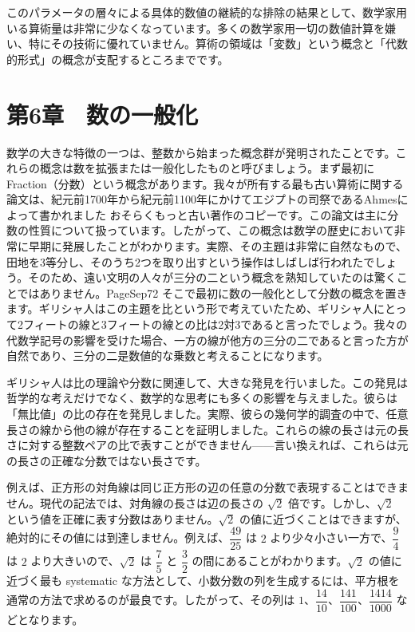 \documentclass[a4paper,11pt,openany]{ltjsbook}
\begin{document}
このパラメータの層々による具体的数値の継続的な排除の結果として、数学家用いる算術量は非常に少なくなっています。多くの数学家用一切の数値計算を嫌い、特にその技術に優れていません。算術の領域は「変数」という概念と「代数的形式」の概念が支配するところまでです。

\chapter{第6章　数の一般化}

数学の大きな特徴の一つは、整数から始まった概念群が発明されたことです。これらの概念は数を拡張または一般化したものと呼びましょう。まず最初に Fraction（分数）という概念があります。我々が所有する最も古い算術に関する論文は、紀元前1700年から紀元前1100年にかけてエジプトの司祭であるAhmesによって書かれました おそらくもっと古い著作のコピーです。この論文は主に分数の性質について扱っています。したがって、この概念は数学の歴史において非常に早期に発展したことがわかります。実際、その主題は非常に自然なもので、田地を3等分し、そのうち2つを取り出すという操作はしばしば行われたでしょう。そのため、遠い文明の人々が三分の二という概念を熟知していたのは驚くことではありません。PageSep{72} そこで最初に数の一般化として分数の概念を置きます。ギリシャ人はこの主題を比という形で考えていたため、ギリシャ人にとって2フィートの線と3フィートの線との比は2対3であると言ったでしょう。我々の代数学記号の影響を受けた場合、一方の線が他方の三分の二であると言った方が自然であり、三分の二是数値的な乗数と考えることになります。

ギリシャ人は比の理論や分数に関連して、大きな発見を行いました。この発見は哲学的な考えだけでなく、数学的な思考にも多くの影響を与えました。彼らは「無比値」の比の存在を発見しました。実際、彼らの幾何学的調査の中で、任意長さの線から他の線が存在することを証明しました。これらの線の長さは元の長さに対する整数ペアの比で表すことができません——言い換えれば、これらは元の長さの正確な分数ではない長さです。

例えば、正方形の対角線は同じ正方形の辺の任意の分数で表現することはできません。現代の記法では、対角線の長さは辺の長さの $\sqrt{2}$ 倍です。しかし、$\sqrt{2}$ という値を正確に表す分数はありません。$\sqrt{2}$ の値に近づくことはできますが、絶対的にその値には到達しません。例えば、$\dfrac{49}{25}$ は $2$ より少々小さい一方で、$\dfrac{9}{4}$ は $2$ より大きいので、$\sqrt{2}$ は $\dfrac{7}{5}$ と $\dfrac{3}{2}$ の間にあることがわかります。$\sqrt{2}$ の値に近づく最も systematic な方法として、小数分数の列を生成するには、平方根を通常の方法で求めるのが最良です。したがって、その列は $1$、$\dfrac{14}{10}$、$\dfrac{141}{100}$、$\dfrac{1414}{1000}$ などとなります。
\end{document}
